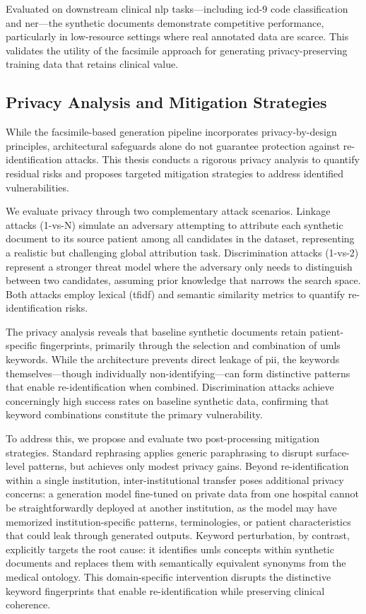 Evaluated on downstream clinical \gls{nlp} tasks—including \gls{icd}-9 code classification and \gls{ner}—the synthetic documents demonstrate competitive performance, particularly in low-resource settings where real annotated data are scarce.
This validates the utility of the facsimile approach for generating privacy-preserving training data that retains clinical value.

\subsection{Privacy Analysis and Mitigation Strategies}

While the facsimile-based generation pipeline incorporates privacy-by-design principles, architectural safeguards alone do not guarantee protection against re-identification attacks.
This thesis conducts a rigorous privacy analysis to quantify residual risks and proposes targeted mitigation strategies to address identified vulnerabilities.

We evaluate privacy through two complementary attack scenarios.
Linkage attacks (1-vs-N) simulate an adversary attempting to attribute each synthetic document to its source patient among all candidates in the dataset, representing a realistic but challenging global attribution task.
Discrimination attacks (1-vs-2) represent a stronger threat model where the adversary only needs to distinguish between two candidates, assuming prior knowledge that narrows the search space.
Both attacks employ lexical (\gls{tfidf}) and semantic similarity metrics to quantify re-identification risks.

The privacy analysis reveals that baseline synthetic documents retain patient-specific fingerprints, primarily through the selection and combination of \gls{umls} keywords.
While the architecture prevents direct leakage of \gls{pii}, the keywords themselves—though individually non-identifying—can form distinctive patterns that enable re-identification when combined.
Discrimination attacks achieve concerningly high success rates on baseline synthetic data, confirming that keyword combinations constitute the primary vulnerability.

To address this, we propose and evaluate two post-processing mitigation strategies.
Standard rephrasing applies generic paraphrasing to disrupt surface-level patterns, but achieves only modest privacy gains.
Beyond re-identification within a single institution, inter-institutional transfer poses additional privacy concerns: a generation model fine-tuned on private data from one hospital cannot be straightforwardly deployed at another institution, as the model may have memorized institution-specific patterns, terminologies, or patient characteristics that could leak through generated outputs.
Keyword perturbation, by contrast, explicitly targets the root cause: it identifies \gls{umls} concepts within synthetic documents and replaces them with semantically equivalent synonyms from the medical ontology.
This domain-specific intervention disrupts the distinctive keyword fingerprints that enable re-identification while preserving clinical coherence.

